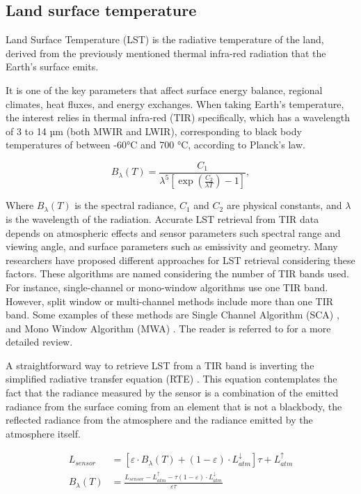     \subsection{Land surface temperature}


        Land Surface Temperature (LST) is the radiative temperature of the land, derived from the previously mentioned thermal infra-red radiation that the Earth’s surface emits.

        It is one of the key parameters that affect surface energy balance, regional climates, heat fluxes, and energy exchanges.
        When taking Earth’s temperature, the interest relies in thermal infra-red (TIR) specifically, which has a wavelength of 3 to 14 µm (both MWIR and LWIR), corresponding to black body temperatures of between -60°C and 700 °C, according to Planck’s law.

        \begin{equation}
            B_{\lambda}(T) = \frac{C_1}{\lambda^5 \left[ \exp\left(\frac{C_2}{\lambda T}\right) - 1\right]},
        \end{equation}

        Where $B_{\lambda}(T)$ is the spectral radiance, $C_1$ and $C_2$ are physical constants, and $\lambda$ is the wavelength of the radiation. 
        Accurate LST retrieval from TIR data depends on atmospheric effects and sensor parameters such spectral range and viewing angle, and surface parameters such as emissivity and geometry. Many researchers have proposed different approaches for LST retrieval considering these factors.
        These algorithms are named considering the number of TIR bands used. For instance, single-channel or mono-window algorithms use one TIR band. However, split window or multi-channel methods include more than one TIR band. Some examples of these methods are Single Channel Algorithm (SCA) \cite{sca2009}, and Mono Window Algorithm (MWA) \cite{mwa2001}. The reader is referred to \cite{LI201314} for a more detailed review.


        A straightforward way to retrieve LST from a TIR band is inverting the simplified radiative transfer equation (RTE) \cite{becker90}. This equation contemplates the fact that the radiance measured by the sensor is a combination of the emitted radiance from the surface coming from an element that is not a blackbody, the reflected radiance from the atmosphere and the radiance emitted by the atmosphere itself.


        \begin{equation}
            \begin{aligned}
            L_{sensor} &= \left[ \varepsilon \cdot B_{\lambda}(T) + (1 - \varepsilon) \cdot L_{atm}^{\downarrow} \right] \tau + L_{atm}^{\uparrow} \\
            B_\lambda (T) &= \frac{L_{sensor} - L_{atm}^{\uparrow}- \tau (1 - \varepsilon) \cdot L_{atm}^{\downarrow}}{\varepsilon \tau} 
            \end{aligned}
        \end{equation}

